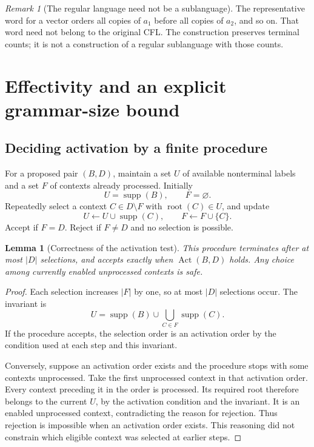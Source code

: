 \documentclass[11pt,a4paper]{article}
\numberwithin{equation}{section}
\theoremstyle{plain}
\newtheorem{lemma}[theorem]{Lemma}
\theoremstyle{definition}
\theoremstyle{remark}
\newtheorem{remark}[theorem]{Remark}
\newcommand{\supp}{\operatorname{supp}}
\newcommand{\rt}{\operatorname{root}}
\newcommand{\Act}{\operatorname{Act}}
\begin{document}
\begin{remark}[The regular language need not be a sublanguage]
The representative word for a vector orders all copies of $a_1$ before all copies of $a_2$, and so on. That word need not belong to the original CFL. The construction preserves terminal counts; it is not a construction of a regular sublanguage with those counts.
\end{remark}

\section{Effectivity and an explicit grammar-size bound}\label{sec:effective}

\subsection{Deciding activation by a finite procedure}
For a proposed pair $(B,D)$, maintain a set $U$ of available nonterminal labels and a set $F$ of contexts already processed. Initially
\[
U=\supp(B),\qquad F=\varnothing.
\]
Repeatedly select a context $C\in D\setminus F$ with $\rt(C)\in U$, and update
\[
U\leftarrow U\cup\supp(C),\qquad F\leftarrow F\cup\{C\}.
\]
Accept if $F=D$. Reject if $F\neq D$ and no selection is possible.

\begin{lemma}[Correctness of the activation test]\label{lem:activation-test}
This procedure terminates after at most $|D|$ selections, and accepts exactly when $\Act(B,D)$ holds. Any choice among currently enabled unprocessed contexts is safe.
\end{lemma}
\begin{proof}
Each selection increases $|F|$ by one, so at most $|D|$ selections occur. The invariant is
\[
U=\supp(B)\cup\bigcup_{C\in F}\supp(C).
\]
If the procedure accepts, the selection order is an activation order by the condition used at each step and this invariant.

Conversely, suppose an activation order exists and the procedure stops with some contexts unprocessed. Take the first unprocessed context in that activation order. Every context preceding it in the order is processed. Its required root therefore belongs to the current $U$, by the activation condition and the invariant. It is an enabled unprocessed context, contradicting the reason for rejection. Thus rejection is impossible when an activation order exists. This reasoning did not constrain which eligible context was selected at earlier steps.
\end{proof}
\end{document}
